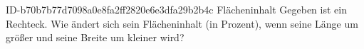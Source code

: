 \begin{exercise}
      {ID-b70b7b77d7098a0e8fa2ff2820e6e3dfa29b2b4c}
      {Flächeninhalt}
  \ifproblem\problem
    Gegeben ist ein Rechteck. Wie ändert sich sein Flächeninhalt (in Prozent),
    wenn seine Länge um  größer und seine Breite um  kleiner wird?
  \fi
\end{exercise}
